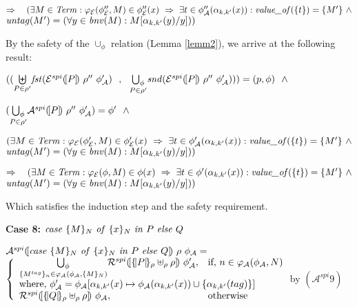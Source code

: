 \documentclass[10pt,a4paper,final,oneside,fleqn]{book}
\begin{document}
\noindent
$\Rightarrow~~~(\exists M\in\mbox{{\itshape Term\/}}:\varphi_\mathcal{E}(\phi''_\mathcal{E},M)\in\phi''_\mathcal{E}(x)~\Rightarrow~\exists t\in\phi''_\mathcal{A}(\alpha_{k,k'}(x)): \mbox{{\itshape value\_of\/}}(\{t\})=\{M'\}~\wedge$\\
$\mbox{{\itshape untag\/}}(M')=(\forall y\in\mbox{{\itshape bnv\/}}(M):M[\alpha_{k,k'}(y)/y]))$ 

\noindent
By the safety of the $\cup_\phi$ relation (Lemma \ref{lemm2}), we arrive at the following result:

\noindent
$((\underset{P\in\rho'}{\biguplus}\mbox{{\itshape fst\/}}(\mathcal{E}^{spi}(\![P]\!)~\rho''~\phi'_\mathcal{A})~~,~~\underset{P\in\rho'}{\bigcup_\phi}\mbox{{\itshape snd\/}}(\mathcal{E}^{spi}(\![P]\!)~\rho''~\phi'_\mathcal{A})))=(p,\phi)~~\wedge$

\noindent
$(\underset{P\in\rho'}{\bigcup_\phi}\mathcal{A}^{spi}(\![P]\!)~\rho''~\phi'_\mathcal{A})=\phi'~~\wedge\vspace{5mm}$

\noindent
$(\exists M\in\mbox{{\itshape Term\/}}:\varphi_\mathcal{E}(\phi'_\mathcal{E},M)\in\phi'_\mathcal{E}(x)~\Rightarrow~\exists t\in\phi'_\mathcal{A}(\alpha_{k,k'}(x)):\mbox{{\itshape value\_of\/}}(\{t\})=\{M'\}~\wedge$\\
$\mbox{{\itshape untag\/}}(M')=(\forall y\in\mbox{{\itshape bnv\/}}(M):M[\alpha_{k,k'}(y)/y]))$\vspace{5mm}

\noindent
$\Rightarrow~~~(\exists M\in\mbox{{\itshape Term\/}}:\varphi_\mathcal{E}(\phi,M)\in\phi(x)~\Rightarrow~\exists t\in\phi'(\alpha_{k,k'}(x)): \mbox{{\itshape value\_of\/}}(\{t\})=\{M'\}~\wedge$\\
$\mbox{{\itshape untag\/}}(M')=(\forall y\in\mbox{{\itshape bnv\/}}(M):M[\alpha_{k,k'}(y)/y]))$\vspace{5mm}

\noindent
Which satisfies the induction step and the safety requirement.\vspace{5mm}

\noindent
{\bf Case 8:} $\mbox{{\itshape case\/} }\{M\}_N\mbox{ {\itshape of\/} }\{x\}_N\mbox{ {\itshape in\/} }P\mbox{ {\itshape else\/} }Q$

\noindent
$\mathcal{A}^{spi}(\![\mbox{{\itshape case\/} }\{M\}_N\mbox{ {\itshape of\/} }\{x\}_N\mbox{ {\itshape in\/} }P\mbox{ {\itshape else\/} }Q]\!)~\rho~\phi_\mathcal{A}=$\\
$\left\{\begin{array}{ll}
\underset{\{M^{tag}\}_{n}\in\varphi_\mathcal{A}(\phi_\mathcal{A},\{M\}_N)}{\bigcup_\phi}\mathcal{R}^{spi}(\![\{\!|P|\!\}_\rho\uplus_\rho\rho]\!)~\phi'_\mathcal{A},&\mbox{if, }n\in\varphi_\mathcal{A}(\phi_\mathcal{A},N)\\
\multicolumn{2}{l}{\mbox{where, }\phi'_\mathcal{A}=\phi_\mathcal{A}[\alpha_{k,k'}(x)\mapsto\phi_\mathcal{A}(\alpha_{k,k'}(x))\cup\{\alpha_{k,k'}({tag})\}]}\\
\mathcal{R}^{spi}(\![\{\!|Q|\!\}_\rho\uplus_\rho\rho]\!)~\phi_\mathcal{A},&\mbox{otherwise}\\
\end{array}\right.$\hfill by $(\mathcal{A}^{spi} 9)$\vspace{5mm}
\end{document}
